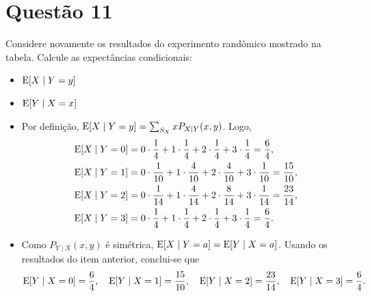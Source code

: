 \section{Questão 11}

Considere novamente os resultados do experimento randômico mostrado na tabela. Calcule as expectâncias condicionais:
\begin{itemize}
    \item [a)] $\mathrm{E}\!\left[X\mid Y=y\right]$
    \item [b)] $\mathrm{E}\!\left[Y\mid X=x\right]$
\end{itemize}

\begin{respostas}
\begin{itemize}
    \item [a)] 
    Por definição, 
    $\mathrm{E}\!\left[X\mid Y=y\right] = \sum_{S_X} x P_{X\mid Y}(x, y)$.
    Logo,
    \begin{align}
        \mathrm{E}\!\left[X\mid Y=0\right] 
        &= 0\cdot\frac{1}{4} + 1\cdot\frac{1}{4} + 2\cdot\frac{1}{4} + 3\cdot\frac{1}{4} 
        = \frac{6}{4},
        \\
        \mathrm{E}\!\left[X\mid Y=1\right]
        &= 0\cdot\frac{1}{10} + 1\cdot\frac{4}{10} + 2\cdot\frac{4}{10} + 3\cdot\frac{1}{10} 
        = \frac{15}{10},
        \\
        \mathrm{E}\!\left[X\mid Y=2\right]
        &= 0\cdot\frac{1}{14} + 1\cdot\frac{4}{14} + 2\cdot\frac{8}{14} + 3\cdot\frac{1}{14} 
        = \frac{23}{14},
        \\
        \mathrm{E}\!\left[X\mid Y=3\right]
        &= 0\cdot\frac{1}{4} + 1\cdot\frac{1}{4} + 2\cdot\frac{1}{4} + 3\cdot\frac{1}{4} 
        = \frac{6}{4}.
    \end{align}
    
    \item [b)] 
    Como $P_{Y\mid X}(x,y)$ é simétrica, $\mathrm{E}\!\left[X\mid Y=a\right] = \mathrm{E}\!\left[Y\mid X=a\right]$. 
    Usando os resultados do item anterior, conclui-se que
    \begin{equation}
        \mathrm{E}\!\left[Y\mid X=0\right] = \frac{6}{4}, \quad 
        \mathrm{E}\!\left[Y\mid X=1\right] = \frac{15}{10}, \quad
        \mathrm{E}\!\left[Y\mid X=2\right] = \frac{23}{14}, \quad
        \mathrm{E}\!\left[Y\mid X=3\right] = \frac{6}{4}.
    \end{equation}
\end{itemize}
\end{respostas}